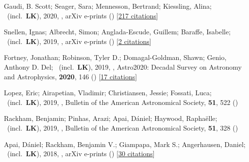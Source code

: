 \item[{\color{numcolor}\scriptsize9}] Gaudi, B. Scott; Seager, Sara; Mennesson, Bertrand; Kiessling, Alina; \etal\ (incl.\ \textbf{LK}), 2020, , arXiv e-prints () [\href{https://ui.adsabs.harvard.edu/abs/2020arXiv200106683G}{217 citations}]

\item[{\color{numcolor}\scriptsize8}] Snellen, Ignas; Albrecht, Simon; Anglada-Escude, Guillem; Baraffe, Isabelle; \etal\ (incl.\ \textbf{LK}), 2019, , arXiv e-prints () [\href{https://ui.adsabs.harvard.edu/abs/2019arXiv190801803S}{2 citations}]

\item[{\color{numcolor}\scriptsize7}] Fortney, Jonathan; Robinson, Tyler D.; Domagal-Goldman, Shawn; Genio, Anthony D. Del; \etal\ (incl.\ \textbf{LK}), 2019, , Astro2020: Decadal Survey on Astronomy and Astrophysics, \textbf{2020}, 146 () [\href{https://ui.adsabs.harvard.edu/abs/2019astro2020T.146F}{17 citations}]

\item[{\color{numcolor}\scriptsize6}] Lopez, Eric; Airapetian, Vladimir; Christiansen, Jessie; Fossati, Luca; \etal\ (incl.\ \textbf{LK}), 2019, , Bulletin of the American Astronomical Society, \textbf{51}, 522 ()

\item[{\color{numcolor}\scriptsize5}] Rackham, Benjamin; Pinhas, Arazi; Apai, D{\'a}niel; Haywood, Rapha{\"e}lle; \etal\ (incl.\ \textbf{LK}), 2019, , Bulletin of the American Astronomical Society, \textbf{51}, 328 ()

\item[{\color{numcolor}\scriptsize4}] Apai, D{\'a}niel; Rackham, Benjamin V.; Giampapa, Mark S.; Angerhausen, Daniel; \etal\ (incl.\ \textbf{LK}), 2018, , arXiv e-prints () [\href{https://ui.adsabs.harvard.edu/abs/2018arXiv180308708A}{30 citations}]

